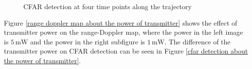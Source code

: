 \documentclass[12pt,DIV14,BCOR12mm,a4paper,footinclude=false,headinclude,parskip=half-,twoside,openright,cleardoublepage=empty,toc=index,bibliography=totoc,listof=totoc]{scrreprt}
\numberwithin{equation}{chapter}
\begin{document}
\begin{figure}[t]
\begin{subfigure}{0.45\textwidth}
    \end{subfigure}\hspace{0.5cm}
    \begin{subfigure}{0.45\textwidth}
        \centering
    \end{subfigure}
    \caption{CFAR detection at four time points along the trajectory}
    \label{cfar detection in part of trajectory}
\end{figure}

Figure \ref{range doppler map about the power of transmitter} shows the effect of transmitter power on the range-Doppler map, where the power in the left image is $5\,\mathrm{mW}$ and the power in the right subfigure is $1\,\mathrm{mW}$. The difference of the transmitter power on CFAR detection can be seen in Figure \ref{cfar detection about the power of transmitter}.
\end{document}
